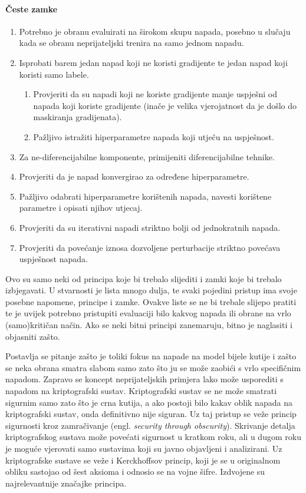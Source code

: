 \documentclass[utf8, diplomski]{fer}
\begin{document}
\paragraph{Česte zamke}
\begin{enumerate}[noitemsep,topsep=0pt,parsep=0pt,partopsep=0pt]
	\item Potrebno je obranu evaluirati na širokom skupu napada, posebno u slučaju kada se obranu neprijateljski trenira na samo jednom napadu.
	\item Isprobati barem jedan napad koji ne koristi gradijente te jedan napad koji koristi samo labele.
	\begin{enumerate}[noitemsep,topsep=0pt,parsep=0pt,partopsep=0pt]
    	\item Provjeriti da su napadi koji ne koriste gradijente manje uspješni od napada koji koriste gradijente (inače je velika vjerojatnost da je došlo do maskiranja gradijenata).
    	\item Pažljivo istražiti hiperparametre napada koji utječu na uspješnost.
    \end{enumerate}
    \item Za ne-diferencijabilne komponente, primijeniti diferencijabilne tehnike.
    \item Provjeriti da je napad konvergirao za određene hiperparametre.
    \item Pažljivo odabrati hiperparametre korištenih napada, navesti korištene parametre i opisati njihov utjecaj.
    \item Provjeriti da su iterativni napadi striktno bolji od jednokratnih napada.
    \item Provjeriti da povećanje iznosa dozvoljene perturbacije striktno povećava uspješnost napada.
\end{enumerate}
\medskip
\par
Ovo su samo neki od principa koje bi trebalo slijediti i zamki koje bi trebalo izbjegavati. U stvarnosti je lista mnogo dulja, te svaki pojedini pristup ima svoje posebne napomene, principe i zamke. Ovakve liste se ne bi trebale slijepo pratiti te je uvijek potrebno pristupiti evaluaciji bilo kakvog napada ili obrane na vrlo (samo)kritičan način. Ako se neki bitni principi zanemaruju, bitno je naglasiti i objasniti zašto. 
\par
Postavlja se pitanje zašto je toliki fokus na napade na model bijele kutije i zašto se neka obrana smatra slabom samo zato što ju se može zaobići s vrlo specifičnim napadom. Zapravo se koncept neprijateljskih primjera lako može usporediti s napadom na kriptografski sustav. Kriptografski sustav se ne može smatrati sigurnim samo zato što je crna kutija, a ako postoji bilo kakav oblik napada na kriptografski sustav, onda definitivno nije siguran. Uz taj pristup se veže princip sigurnosti kroz zamračivanje (engl. \textit{security through obscurity}). Skrivanje detalja kriptografskog sustava može povećati sigurnost u kratkom roku, ali u dugom roku je moguće vjerovati samo sustavima koji su javno objavljeni i analizirani. Uz kriptografske sustave se veže i Kerckhoffsov princip, koji je se u originalnom obliku sastojao od šest aksioma i odnosio se na vojne šifre. Izdvojene su najrelevantnije značajke principa.
\end{document}
